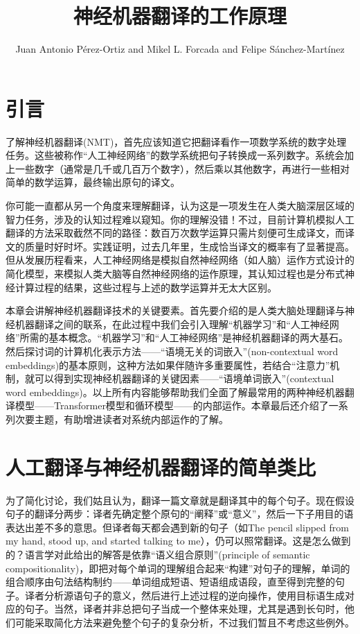 \documentclass[output=paper,colorlinks,citecolor=brown]{langscibook}
\author{Juan Antonio Pérez-Ortiz\orcid{0000-0001-7659-8908}\affiliation{西班牙阿利坎特大学} and  Mikel L. Forcada\orcid{0000-0003-0843-6442}\affiliation{西班牙阿利坎特大学} and Felipe Sánchez-Martínez\orcid{0000-0002-2295-2630}\affiliation{西班牙阿利坎特大学}}
\title{神经机器翻译的工作原理}
\begin{document}
\maketitle

\section{引言}

了解神经机器翻译(NMT)，首先应该知道它把翻译看作一项数学系统的数字处理任务。这些被称作“人工神经网络”的数学系统把句子转换成一系列数字。系统会加上一些数字（通常是几千或几百万个数字），然后乘以其他数字，再进行一些相对简单的数学运算，最终输出原句的译文。

你可能一直都从另一个角度来理解翻译，认为这是一项发生在人类大脑深层区域的智力任务，涉及的认知过程难以窥知。你的理解没错！不过，目前计算机模拟人工翻译的方法采取截然不同的路径：数百万次数学运算只需片刻便可生成译文，而译文的质量时好时坏。实践证明，过去几年里，生成恰当译文的概率有了显著提高。但从发展历程看来，人工神经网络是模拟自然神经网络（如人脑）运作方式设计的简化模型，来模拟人类大脑等自然神经网络的运作原理，其认知过程也是分布式神经计算过程的结果，这些过程与上述的数学运算并无太大区别。

本章会讲解神经机器翻译技术的关键要素。首先要介绍的是人类大脑处理翻译与神经机器翻译之间的联系，在此过程中我们会引入理解“机器学习”和“人工神经网络”所需的基本概念。“机器学习”和“人工神经网络”是神经机器翻译的两大基石。然后探讨词的计算机化表示方法——“语境无关的词嵌入”(non-contextual word embeddings)的基本原则，这种方法如果伴随许多重要属性，若结合“注意力”机制，就可以得到实现神经机器翻译的关键因素——“语境单词嵌入”(contextual word embeddings)。以上所有内容能够帮助我们全面了解最常用的两种神经机器翻译模型——Transformer模型和循环模型——的内部运作。本章最后还介绍了一系列次要主题，有助增进读者对系统内部运作的了解。


\section{人工翻译与神经机器翻译的简单类比}

为了简化讨论，我们姑且认为，翻译一篇文章就是翻译其中的每个句子。现在假设句子的翻译分两步：译者先确定整个原句的“阐释”或“意义”，然后一下子用目的语表达出差不多的意思。但译者每天都会遇到新的句子（如The pencil slipped from my hand, stood up, and started talking to me），仍可以照常翻译。这是怎么做到的？语言学对此给出的解答是依靠“语义组合原则”(principle of semantic compositionality)，即把对每个单词的理解组合起来“构建”对句子的理解，单词的组合顺序由句法结构制约——单词组成短语、短语组成语段，直至得到完整的句子。译者分析源语句子的意义，然后进行上述过程的逆向操作，使用目标语生成对应的句子。当然，译者并非总把句子当成一个整体来处理，尤其是遇到长句时，他们可能采取简化方法来避免整个句子的复杂分析，不过我们暂且不考虑这些例外。
\end{document}
